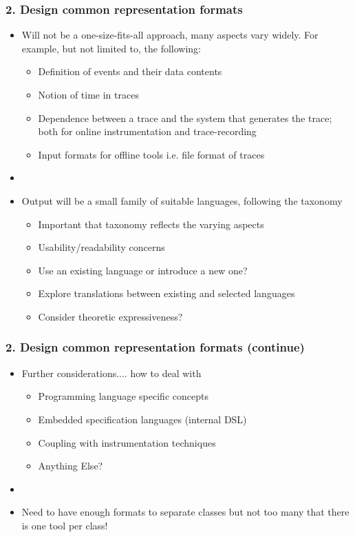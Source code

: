 \documentclass{beamer}
\newcommand{\addhere}{{\color{red} Anything Else?}}
\begin{document}
\begin{frame}
\frametitle{2. Design common representation formats}
\begin{itemize}
\item Will not be a one-size-fits-all approach, many aspects vary
  widely. For example, but not limited to, the following:
  \begin{itemize}
  \item Definition of events and their data contents
  \item Notion of time in traces
  \item Dependence between a trace and the system that generates the
    trace; both for online instrumentation and trace-recording
  \item Input formats for offline tools i.e. file format of traces
  \end{itemize}
\item[]
\item Output will be a small family of suitable languages, following
  the taxonomy
  \begin{itemize}
  \item Important that taxonomy reflects the varying aspects
  \item Usability/readability concerns
  \item Use an existing language or introduce a new one?
  \item Explore translations between existing and selected languages
  \item Consider theoretic expressiveness?
\end{itemize}
\end{itemize}
\end{frame}	

\begin{frame}
\frametitle{2. Design common representation formats (continue)}
\begin{itemize}
	\item Further considerations.... how to deal with
	\begin{itemize}
		\item Programming language specific concepts
		\item Embedded specification languages (internal DSL)
		\item Coupling with instrumentation techniques
		\item \addhere{}
	\end{itemize}
	\item[]
	\item Need to have enough formats to separate classes but not too many that there is one tool per class!
\end{itemize}
\end{frame}
\end{document}
